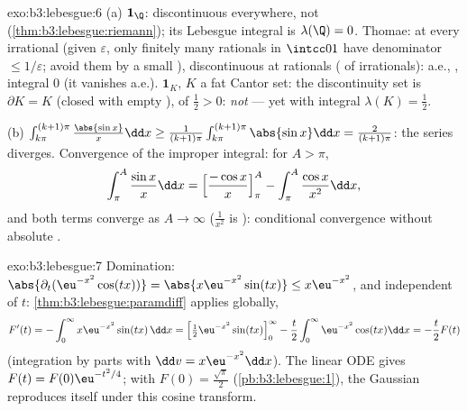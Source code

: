 \begin{solution}{exo:b3:lebesgue:6}
(a) $\mathbf 1_\Q$: discontinuous everywhere, not
 (\cref{thm:b3:lebesgue:riemann}); its
Lebesgue integral is $\lambda(\Q) = 0$. Thomae:  at
every irrational (given $\varepsilon$, only finitely many
rationals in $\intcc01$ have denominator $\leq
1/\varepsilon$; avoid them by a small ),
discontinuous at rationals ( of irrationals): 
a.e., , integral $0$ (it vanishes a.e.).
$\mathbf 1_K$, $K$ a fat Cantor set: the discontinuity set is
$\partial K = K$ (closed with empty ), of 
$\frac12 > 0$: \emph{not}  --- yet
 with integral $\lambda(K) = \frac12$.

(b) $\int_{k\pi}^{(k+1)\pi}\frac{\abs{\sin x}}x\dd x \geq
\frac1{(k+1)\pi}\int_{k\pi}^{(k+1)\pi}\abs{\sin x}\dd x =
\frac{2}{(k+1)\pi}$: the series diverges. Convergence of the
improper integral: for $A > \pi$,
\[
\int_\pi^A\frac{\sin x}x\dd x = \Bigl[\frac{-\cos
x}x\Bigr]_\pi^A - \int_\pi^A\frac{\cos x}{x^2}\dd x,
\]
and both terms converge as $A \to \infty$ ($\frac1{x^2}$ is
): conditional convergence without absolute
.
\end{solution}

\begin{solution}{exo:b3:lebesgue:7}
Domination: $\abs{\partial_t(\eu^{-x^2}\cos(tx))} =
\abs{x\eu^{-x^2}\sin(tx)} \leq x\eu^{-x^2}$,  and
independent of $t$: \cref{thm:b3:lebesgue:paramdiff} applies
globally,
\[
F'(t) = -\int_0^\infty x\eu^{-x^2}\sin(tx)\,\dd x
= \Bigl[\tfrac12\eu^{-x^2}\sin(tx)\Bigr]_0^\infty
- \frac t2\int_0^\infty\eu^{-x^2}\cos(tx)\dd x
= -\frac t2F(t)
\]
(integration by parts with $\dd v = x\eu^{-x^2}\dd x$). The
linear ODE gives $F(t) = F(0)\eu^{-t^2/4}$; with $F(0) =
\frac{\sqrt\pi}2$ (\cref{pb:b3:lebesgue:1}), the Gaussian
reproduces itself under this cosine transform.
\end{solution}

